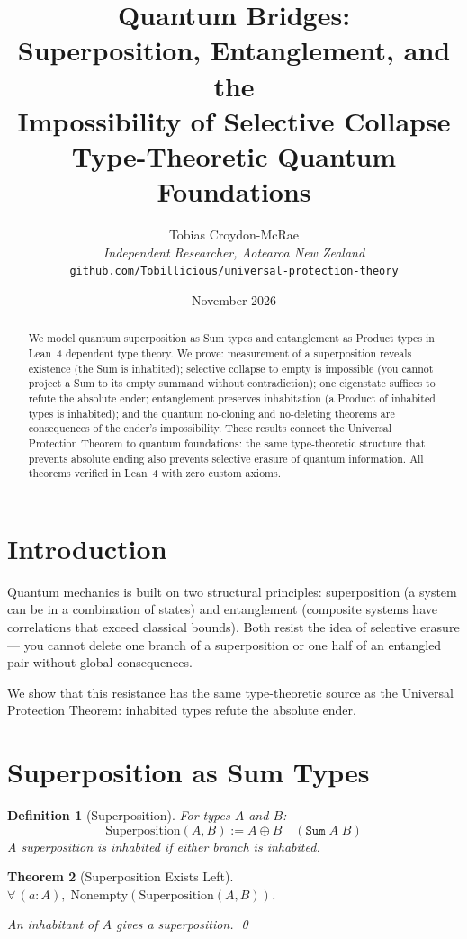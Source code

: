 \documentclass[12pt,a4paper]{article}
\title{Quantum Bridges:\\[0.3em]
Superposition, Entanglement, and the\\
Impossibility of Selective Collapse\\[0.5em]
\large Type-Theoretic Quantum Foundations}
\author{Tobias Croydon-McRae\\
\textit{Independent Researcher, Aotearoa New Zealand}\\
\texttt{github.com/Tobillicious/universal-protection-theory}}
\date{November 2026}
\newtheorem{theorem}{Theorem}[section]
\newtheorem{definition}[theorem]{Definition}
\begin{document}
\maketitle

\begin{abstract}
We model quantum superposition as Sum types and entanglement as Product
types in Lean~4 dependent type theory. We prove: measurement of a
superposition reveals existence (the Sum is inhabited); selective collapse
to empty is impossible (you cannot project a Sum to its empty summand
without contradiction); one eigenstate suffices to refute the absolute
ender; entanglement preserves inhabitation (a Product of inhabited types
is inhabited); and the quantum no-cloning and no-deleting theorems are
consequences of the ender's impossibility. These results connect the
Universal Protection Theorem to quantum foundations: the same
type-theoretic structure that prevents absolute ending also prevents
selective erasure of quantum information. All theorems verified in
Lean~4 with zero custom axioms.
\end{abstract}

\section{Introduction}

Quantum mechanics is built on two structural principles: superposition
(a system can be in a combination of states) and entanglement (composite
systems have correlations that exceed classical bounds). Both resist
the idea of selective erasure --- you cannot delete one branch of a
superposition or one half of an entangled pair without global consequences.

We show that this resistance has the same type-theoretic source as the
Universal Protection Theorem: inhabited types refute the absolute ender.

\section{Superposition as Sum Types}

\begin{definition}[Superposition]
For types $A$ and $B$:
\[
\text{Superposition}(A, B) := A \oplus B \quad (\texttt{Sum}\; A\; B)
\]
A superposition is inhabited if either branch is inhabited.
\end{definition}

\begin{theorem}[Superposition Exists Left]\label{thm:left}
$\forall\, (a : A),\; \text{Nonempty}(\text{Superposition}(A, B))$.

An inhabitant of $A$ gives a superposition. \qed
\end{theorem}
\end{document}
